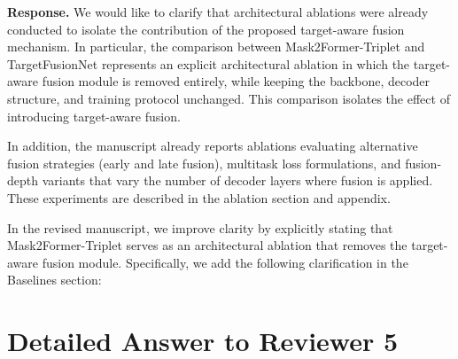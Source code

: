 \documentclass{article}
\begin{document}


\textbf{Response.}
We would like to clarify that architectural ablations were already conducted to isolate the contribution of the proposed target-aware fusion mechanism.
%
In particular, the comparison between Mask2Former-Triplet and TargetFusionNet represents an explicit architectural ablation in which the target-aware fusion module is removed entirely, while keeping the backbone, decoder structure, and training protocol unchanged. This comparison isolates the effect of introducing target-aware fusion.

In addition, the manuscript already reports ablations evaluating alternative fusion strategies (early and late fusion), multitask loss formulations, and fusion-depth variants that vary the number of decoder layers where fusion is applied. These experiments are described in the ablation section and appendix.

In the revised manuscript, we improve clarity by explicitly stating that Mask2Former-Triplet serves as an architectural ablation that removes the target-aware fusion module. Specifically, we add the following clarification in the Baselines section:



\section{Detailed Answer to Reviewer 5}
\end{document}
